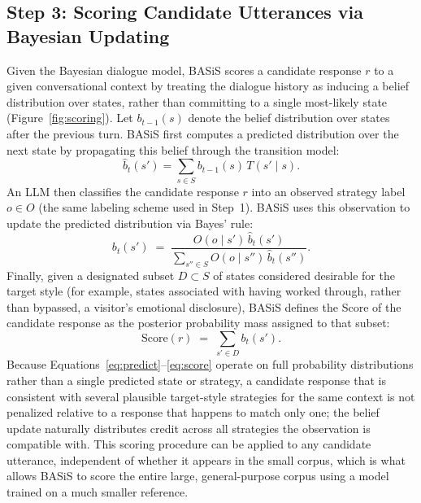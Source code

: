 \documentclass[manuscript,review,anonymous]{acmart}
\begin{document}
\subsection{Step 3: Scoring Candidate Utterances via Bayesian Updating}
\label{sec:scoring}
Given the Bayesian dialogue model, BASiS scores a candidate response $r$ to a given conversational context by treating the dialogue history as inducing a belief distribution over states, rather than committing to a single most-likely state (Figure~\ref{fig:scoring}). Let $b_{t-1}(s)$ denote the belief distribution over states after the previous turn. BASiS first computes a predicted distribution over the next state by propagating this belief through the transition model:
\begin{equation}
  \hat{b}_t(s') = \sum_{s \in S} b_{t-1}(s)\, T(s' \mid s).
  \label{eq:predict}
\end{equation}
An LLM then classifies the candidate response $r$ into an observed strategy label $o \in O$ (the same labeling scheme used in Step~1). BASiS uses this observation to update the predicted distribution via Bayes' rule:
\begin{equation}
  b_t(s') \;=\; \frac{O(o \mid s')\, \hat{b}_t(s')}{\displaystyle\sum_{s'' \in S} O(o \mid s'')\, \hat{b}_t(s'')}.
  \label{eq:update}
\end{equation}
Finally, given a designated subset $D \subset S$ of states considered desirable for the target style (for example, states associated with having worked through, rather than bypassed, a visitor's emotional disclosure), BASiS defines the Score of the candidate response as the posterior probability mass assigned to that subset:
\begin{equation}
  \mathrm{Score}(r) \;=\; \sum_{s' \in D} b_t(s').
  \label{eq:score}
\end{equation}
Because Equations~\eqref{eq:predict}--\eqref{eq:score} operate on full probability distributions rather than a single predicted state or strategy, a candidate response that is consistent with several plausible target-style strategies for the same context is not penalized relative to a response that happens to match only one; the belief update naturally distributes credit across all strategies the observation is compatible with. This scoring procedure can be applied to any candidate utterance, independent of whether it appears in the small corpus, which is what allows BASiS to score the entire large, general-purpose corpus using a model trained on a much smaller reference.
\end{document}
